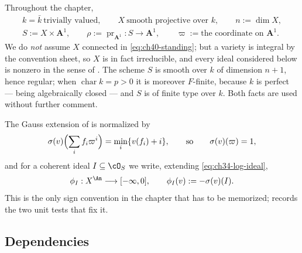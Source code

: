 Throughout the chapter,
\begin{equation}
\label{eq:ch40-standing}
 \begin{gathered}
 k=\bar k\ \text{trivially valued},\qquad
 X\ \text{smooth projective over }k,\qquad n:=\dim X,\\
 S:=X\times\mathbf A^1,\qquad
 \rho:=\operatorname{pr}_{\mathbf A^1}:S\to\mathbf A^1,\qquad
 \varpi:=\text{the coordinate on }\mathbf A^1 .
 \end{gathered}
\end{equation}
We do \emph{not} assume $X$ connected in
\eqref{eq:ch40-standing}; but a variety is integral by the convention sheet,
so $X$ is in fact irreducible, and every ideal considered below is nonzero
in the sense of .  The scheme $S$ is
smooth over $k$ of dimension $n+1$, hence regular; when
$\operatorname{char}k=p>0$ it is moreover $F$-finite, because $k$ is
perfect --- being algebraically closed --- and $S$ is of finite type over
$k$.  Both facts are used without further comment.

The Gauss extension of  is normalized by
\begin{equation}
\label{eq:ch40-gauss}
 \sigma(v)\Bigl(\sum_i f_i\varpi^i\Bigr)=\min_i\{v(f_i)+i\},
 \qquad\text{so}\qquad
 \sigma(v)(\varpi)=1,
\end{equation}
and for a coherent ideal $I\subseteq\cO_S$ we write, extending
\eqref{eq:ch34-log-ideal},
\begin{equation}
\label{eq:ch40-ideal-function}
 \phi_I:X^{\An}\longrightarrow[-\infty,0],
 \qquad
 \phi_I(v):=-\sigma(v)(I).
\end{equation}
This is the only sign convention in the chapter that has to be memorized;
 records the two unit tests that fix it.

\subsection{Dependencies}
\label{sec:ch40-dependencies}

